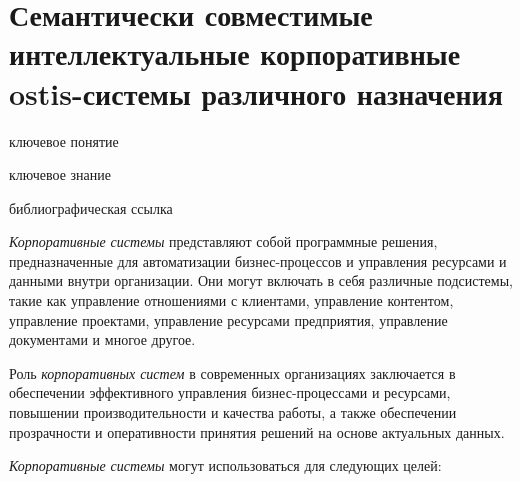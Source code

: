 \section{Семантически совместимые интеллектуальные корпоративные ostis-системы различного назначения}
{\label{sec_corporate_ostis_system}} 

\begin{SCn}

\bigskip

\begin{scnrelfromlist}{ключевое понятие}
\end{scnrelfromlist}

\bigskip

\begin{scnrelfromlist}{ключевое знание}
\end{scnrelfromlist}

\bigskip

\begin{scnrelfromlist}{библиографическая ссылка}
\end{scnrelfromlist}

\end{SCn}

\textit{Корпоративные системы} представляют собой программные решения, предназначенные для автоматизации бизнес-процессов и управления ресурсами и данными внутри организации. Они могут включать в себя различные подсистемы, такие как управление отношениями с клиентами, управление контентом, управление проектами, управление ресурсами предприятия, управление документами и многое другое.

Роль \textit{корпоративных систем} в современных организациях заключается в обеспечении эффективного управления бизнес-процессами и ресурсами, повышении производительности и качества работы, а также обеспечении прозрачности и оперативности принятия решений на основе актуальных данных.

\textit{Корпоративные системы} могут использоваться для следующих целей:

